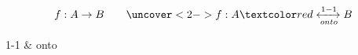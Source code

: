 \begin{frame}{}
  \begin{definition}
    \[
      f: A \to B \qquad \uncover<2->{f: A \red{\;\xleftrightarrow[onto]{1-1}\;} B}
    \]

    \begin{center}
      {1-1 \& onto}
    \end{center}
  \end{definition}
\end{frame}



% 
% 
% 
